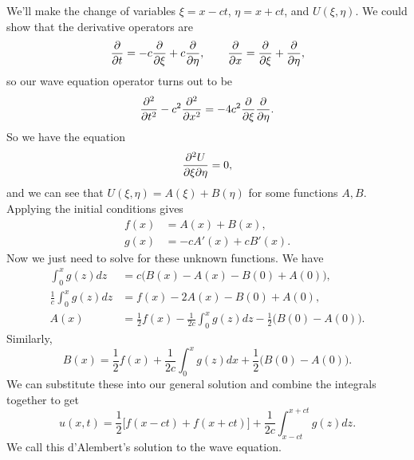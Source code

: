 \documentclass[../m180main.tex]{subfiles}
\begin{document}
We'll make the change of variables $\xi = x - ct$, $\eta = x + ct$, and $U(\xi, \eta)$.
We could show that the derivative operators are
\[ \frac{\partial}{\partial t} = -c \frac{\partial}{\partial \xi} + c \frac{\partial}{\partial \eta}, \qquad \frac{\partial}{\partial x} = \frac{\partial}{\partial \xi} + \frac{\partial}{\partial \eta}, \]
so our wave equation operator turns out to be
\[ \frac{\partial^2}{\partial t^2} - c^2 \frac{\partial^2}{\partial x^2} = -4c^2 \frac{\partial}{\partial \xi} \frac{\partial}{\partial \eta}. \]
So we have the equation
\[ \frac{\partial^2 U}{\partial \xi \partial \eta} = 0, \]
and we can see that $U(\xi, \eta) = A(\xi) + B(\eta)$ for some functions $A,B$.
Applying the initial conditions gives
\begin{align*}
    f(x) &= A(x) + B(x), \\
    g(x) &= -cA'(x) + cB'(x).
\end{align*}
Now we just need to solve for these unknown functions.
We have
\begin{align*}
    \int_{0}^{x} g(z) dz &= c \big( B(x) - A(x) - B(0) + A(0) \big), \\
    \frac{1}{c} \int_{0}^{x} g(z) dz &= f(x) - 2A(x) - B(0) + A(0), \\
    A(x) &= \frac{1}{2} f(x) - \frac{1}{2c} \int_{0}^{x} g(z) dz - \frac{1}{2} \big( B(0) - A(0) \big).
\end{align*}
Similarly,
\[ B(x) = \frac{1}{2} f(x) + \frac{1}{2c} \int_{0}^{x} g(z) dx + \frac{1}{2} \big( B(0) - A(0) \big). \]
We can substitute these into our general solution and combine the integrals together to get
\[ u(x,t) = \frac{1}{2} \big[ f(x-ct) + f(x+ct) \big] + \frac{1}{2c} \int_{x - ct}^{x + ct} g(z) dz. \]
We call this d'Alembert's solution to the wave equation.
\end{document}
